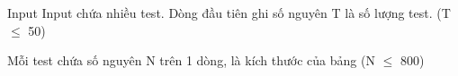 Input
Input chứa nhiều test. Dòng đầu tiên ghi số nguyên T là số lượng test. (T $\le$ 50)

Mỗi test chứa số nguyên N trên 1 dòng, là kích thước của bảng (N $\le$ 800)